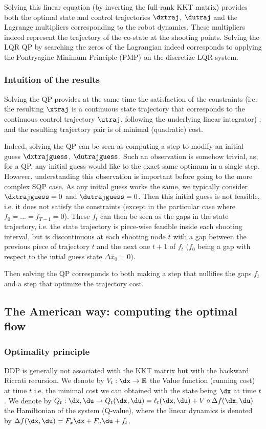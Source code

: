 \documentclass[10pt,a4paper]{article}
\begin{document}
Solving this linear equation (by inverting the full-rank KKT matrix) provides both the optimal state and control trajectories $\dxtraj$, $\dutraj$ and the Lagrange multipliers corresponding to the robot dynamics.
These multipliers indeed represent the trajectory of the co-state at the shooting points.
Solving the LQR QP by searching the zeros of the Lagrangian indeed corresponds to applying the Pontryagine Minimum Principle (PMP) on the discretize LQR system.

\subsubsection{Intuition of the results}
Solving the QP provides at the same time the satisfaction of the constraints (i.e. the resulting $\xtraj$ is a continuous state trajectory that corresponds to the continuous control trajectory $\utraj$, following the underlying linear integrator) ; and the resulting trajectory pair is of minimal (quadratic) cost.

Indeed, solving the QP can be seen as computing a step to modify an initial-guess $\dxtrajguess$, $\dutrajguess$. Such an observation is somehow trivial, as, for a QP, any initial guess would like to the exact same optimum in a single step.
However, understanding this observation is important before going to the more complex SQP case.
As any initial guess works the same, we typically consider $\dxtrajguess=0$ and $\dutrajguess=0$.
Then this initial guess is not feasible, i.e. it does not satisfy the constraints (except in the particular case where $f_0 = ... = f_{T-1} = 0$). These $f_t$ can then be seen as the gaps in the state trajectory, i.e. the state trajectory is piece-wise feasible inside each shooting interval, but is discontinuous at each shooting node $t$ with a gap between the previous piece of trajectory $t$ and the next one $t+1$ of $f_t$ ($f_0$ being a gap with respect to the intial guess state $\Delta \bar x_0= 0$).

Then solving the QP corresponds to both making a step that nullifies the gaps $f_t$ and a step that optimize the trajectory cost.


\subsection{The American way: computing the optimal flow}

\subsubsection{Optimality principle}
DDP is generally not associated with the KKT matrix but with the backward Riccati recursion.
We denote by $V_t: \dx \rightarrow \mathbb{R}$ the Value function (running cost) at time $t$ i.e. the minimal cost we can obtained with the state being $\dx$ at time $t$.
We denote by $Q_t: \dx,\du \rightarrow Q_t(\dx,\du) = \ell_t(\dx,\du) + V \circ \Delta f(\dx,\du)$ the Hamiltonian of the system (Q-value), where the linear dynamics is denoted by $\Delta f(\dx,\du) = F_x \dx + F_u \du + f_t$.
\end{document}
